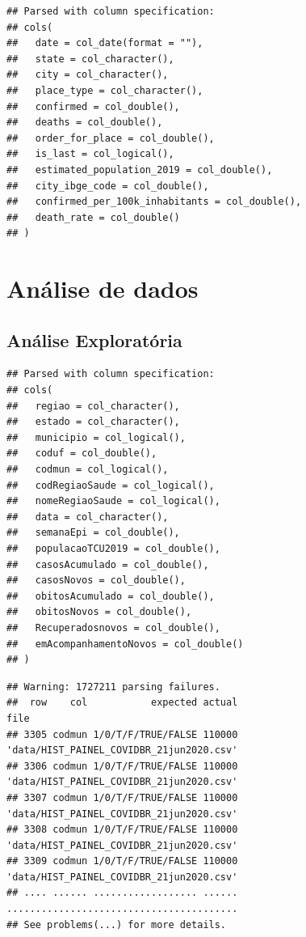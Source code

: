 \documentclass[]{book}
\begin{document}
\begin{verbatim}
## Parsed with column specification:
## cols(
##   date = col_date(format = ""),
##   state = col_character(),
##   city = col_character(),
##   place_type = col_character(),
##   confirmed = col_double(),
##   deaths = col_double(),
##   order_for_place = col_double(),
##   is_last = col_logical(),
##   estimated_population_2019 = col_double(),
##   city_ibge_code = col_double(),
##   confirmed_per_100k_inhabitants = col_double(),
##   death_rate = col_double()
## )
\end{verbatim}

\section{Análise de dados}\label{anuxe1lise-de-dados}

\subsection{Análise Exploratória}\label{anuxe1lise-exploratuxf3ria}

\begin{verbatim}
## Parsed with column specification:
## cols(
##   regiao = col_character(),
##   estado = col_character(),
##   municipio = col_logical(),
##   coduf = col_double(),
##   codmun = col_logical(),
##   codRegiaoSaude = col_logical(),
##   nomeRegiaoSaude = col_logical(),
##   data = col_character(),
##   semanaEpi = col_double(),
##   populacaoTCU2019 = col_double(),
##   casosAcumulado = col_double(),
##   casosNovos = col_double(),
##   obitosAcumulado = col_double(),
##   obitosNovos = col_double(),
##   Recuperadosnovos = col_double(),
##   emAcompanhamentoNovos = col_double()
## )
\end{verbatim}

\begin{verbatim}
## Warning: 1727211 parsing failures.
##  row    col           expected actual                                     file
## 3305 codmun 1/0/T/F/TRUE/FALSE 110000 'data/HIST_PAINEL_COVIDBR_21jun2020.csv'
## 3306 codmun 1/0/T/F/TRUE/FALSE 110000 'data/HIST_PAINEL_COVIDBR_21jun2020.csv'
## 3307 codmun 1/0/T/F/TRUE/FALSE 110000 'data/HIST_PAINEL_COVIDBR_21jun2020.csv'
## 3308 codmun 1/0/T/F/TRUE/FALSE 110000 'data/HIST_PAINEL_COVIDBR_21jun2020.csv'
## 3309 codmun 1/0/T/F/TRUE/FALSE 110000 'data/HIST_PAINEL_COVIDBR_21jun2020.csv'
## .... ...... .................. ...... ........................................
## See problems(...) for more details.
\end{verbatim}
\end{document}
